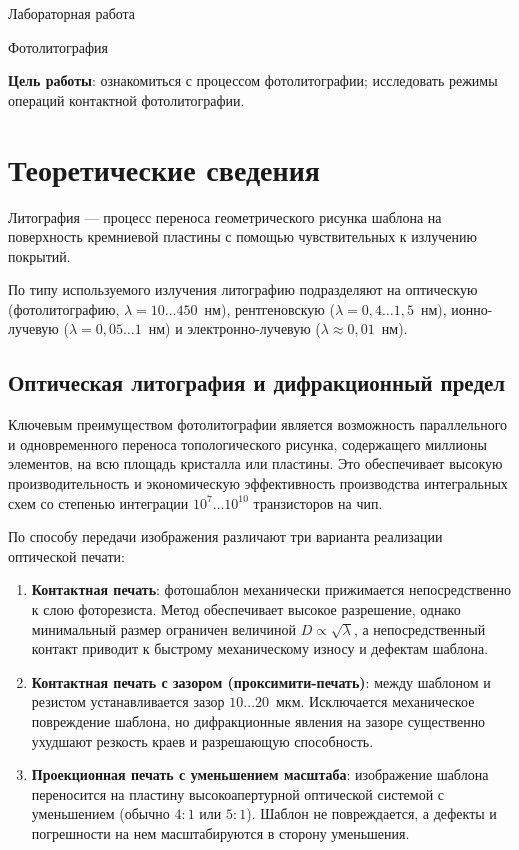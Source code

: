 \documentclass[12pt,a4paper]{article}
\theoremstyle{plain}
\theoremstyle{definition}
\theoremstyle{remark}
\numberwithin{equation}{section}
\begin{document}
\begin{center}
    \Large Лабораторная работа 
\end{center}

\begin{center}
    \large Фотолитография
\end{center}

\textbf{Цель работы}: ознакомиться с процессом фотолитографии; 
исследовать режимы операций контактной фотолитографии.

\section{Теоретические сведения}

Литография — процесс переноса геометрического рисунка шаблона на поверхность 
кремниевой пластины с помощью чувствительных к излучению покрытий.

По типу используемого излучения литографию подразделяют на оптическую 
(фотолитографию, $\lambda = 10 \dots 450$~нм), рентгеновскую ($\lambda = 0{,}4 \dots 1{,}5$~нм), 
ионно-лучевую ($\lambda = 0{,}05 \dots 1$~нм) и электронно-лучевую ($\lambda \approx 0{,}01$~нм).

\subsection{Оптическая литография и дифракционный предел}

Ключевым преимуществом фотолитографии является возможность параллельного и одновременного 
переноса топологического рисунка, содержащего миллионы элементов, на всю площадь кристалла 
или пластины. Это обеспечивает высокую производительность и экономическую эффективность 
производства интегральных схем со степенью интеграции $10^7 \dots 10^{10}$ транзисторов на чип.

По способу передачи изображения различают три варианта реализации оптической печати:
\begin{enumerate}
  \item \textbf{Контактная печать}: фотошаблон механически прижимается непосредственно к слою 
  фоторезиста. Метод обеспечивает высокое разрешение, однако минимальный размер ограничен 
  величиной $D \propto \sqrt{\lambda}$, а непосредственный контакт приводит к быстрому механическому 
  износу и дефектам шаблона.
  \item \textbf{Контактная печать с зазором (проксимити-печать)}: между шаблоном и резистом 
  устанавливается зазор $10 \dots 20$~мкм. Исключается механическое повреждение шаблона, но 
  дифракционные явления на зазоре существенно ухудшают резкость краев и разрешающую способность.
  \item \textbf{Проекционная печать с уменьшением масштаба}: изображение шаблона переносится 
  на пластину высокоапертурной оптической системой с уменьшением (обычно $4:1$ или $5:1$). 
  Шаблон не повреждается, а дефекты и погрешности на нем масштабируются в сторону уменьшения.
\end{enumerate}
\end{document}
